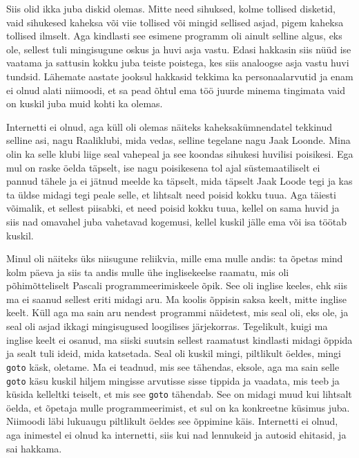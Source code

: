 
Siis olid ikka juba diskid olemas. Mitte need sihuksed, kolme tollised 
disketid, vaid sihukesed  kaheksa või viie tollised või mingid sellised asjad, 
pigem kaheksa tollised ilmselt. Aga kindlasti see esimene programm oli ainult 
selline algus, eks ole, sellest tuli mingisugune  oskus ja huvi asja vastu. 
Edasi hakkasin siis nüüd ise vaatama ja  sattusin kokku juba teiste poistega, 
kes siis analoogse asja vastu huvi tundsid. Lähemate aastate jooksul hakkasid 
tekkima ka personaalarvutid ja enam ei olnud alati niimoodi, et sa pead õhtul 
ema töö juurde minema tingimata vaid on kuskil juba muid kohti ka olemas.


Internetti ei olnud, aga küll oli olemas näiteks kaheksakümnendatel tekkinud 
selline asi, nagu Raaliklubi, mida vedas, selline tegelane 
nagu Jaak Loonde. Mina olin ka selle klubi liige seal 
vahepeal ja see koondas sihukesi huvilisi poisikesi. Ega mul on raske öelda 
täpselt,  ise nagu poisikesena tol ajal süstemaatiliselt ei pannud tähele ja ei 
jätnud meelde ka täpselt, mida täpselt Jaak Loode tegi ja kas ta üldse midagi 
tegi peale selle, et lihtsalt need poisid kokku tuua. Aga täiesti võimalik, et 
sellest piisabki, et need poisid kokku tuua, kellel on sama huvid ja siis nad 
omavahel juba vahetavad kogemusi, kellel kuskil jälle ema või isa töötab 
kuskil. 

Minul oli näiteks üks niisugune reliikvia, mille ema mulle andis: ta õpetas 
mind kolm päeva ja siis ta andis mulle ühe inglisekeelse raamatu, mis oli 
põhimõtteliselt Pascali programmeerimiskeele õpik. See oli inglise keeles, ehk 
siis ma ei saanud sellest eriti midagi aru. Ma koolis õppisin saksa keelt, 
mitte inglise keelt. Küll aga ma sain aru 
nendest  programmi näidetest, mis seal oli, eks ole, ja seal oli asjad ikkagi 
mingisugused loogilises  järjekorras. Tegelikult, kuigi ma inglise keelt ei 
osanud, ma siiski suutsin sellest raamatust kindlasti midagi õppida ja sealt 
tuli ideid, mida katsetada. Seal oli kuskil mingi, piltlikult öeldes, mingi 
\verb|goto| käsk, oletame. Ma ei teadnud, mis see tähendas, eksole, aga ma sain 
selle \verb|goto| käsu kuskil hiljem mingisse arvutisse sisse tippida ja 
vaadata, mis teeb ja küsida kelleltki teiselt, et mis see \verb|goto| tähendab. 
See on midagi muud kui lihtsalt öelda, et õpetaja mulle programmeerimist, et 
sul on ka konkreetne küsimus juba. Niimoodi läbi lukuaugu piltlikult öeldes see 
õppimine käis. Internetti ei olnud, aga  inimestel ei olnud ka internetti, siis 
kui nad  lennukeid ja autosid ehitasid, ja sai hakkama.

